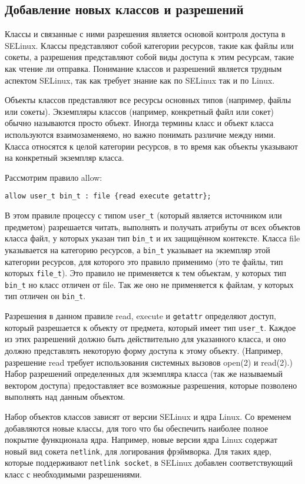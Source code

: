 \documentclass{./../class/UIR}
\begin{document}
\subsection{Добавление новых классов и разрешений}
    Классы и связанные с ними разрешения является основой контроля доступа в
    SELinux. Классы представляют собой категории ресурсов, такие как файлы или
    сокеты, а разрешения представляют собой виды доступа к этим ресурсам, такие
    как чтение ли отправка. Понимание классов и разрешений является трудным
    аспектом SELinux, так как требует знание как по SELinux так и по Linux.

	Объекты классов представляют все ресурсы основных типов (например, файлы или
	сокеты). Экземпляры классов (например, конкретный файл или сокет) обычно
	называются просто объект. Иногда термины класс и объект класса используются
	взаимозаменяемо, но важно понимать различие между ними. Класса относятся к
	целой категории ресурсов, в то время как объекты указывают на конкретный
	экземпляр класса.
	
	Рассмотрим правило allow:
	\begin{verbatim}
allow user_t bin_t : file {read execute getattr};
	\end{verbatim}
	В этом правиле процессу с типом \verb"user_t" (который является источником или
	предметом) разрешается читать, выполнять и получать атрибуты от всех объектов
	класса файл, у которых указан тип \verb"bin_t" и их защищённом контексте.
	Класса file указывается на категорию ресурсов, а \verb"bin_t" указывает на экземпляр этой
	категории ресурсов, для которого это правило применимо (это те файлы, тип
	которых \verb"file_t"). Это правило не применяется к тем объектам, у которых
	тип \verb"bin_t" но класс отличен от file. Так же оно не применяется к файлам, у
	которых тип отличен он \verb"bin_t".
	
	Разрешения в данном правиле read, execute и \verb"getattr" определяют доступ,
	который разрешается к объекту от предмета, который имеет тип \verb"user_t".
	Каждое из этих разрешений должно быть действительно для указанного класса, и оно должно
	представлять некоторую форму доступа к этому объекту. (Например, разрешение
	read требует использования системных вызовов open(2) и read(2).) Набор
	разрешений определенных для экземпляра класса (так же называемый вектором
	доступа) предоставляет все возможные разрешения, которые позволено выполнять
	над данным объектом.
	
	Набор объектов классов зависят от версии SELinux и ядра Linux. Со временем
	добавляются новые классы, для того что бы обеспечить наиболее полное покрытие
	функционала ядра. Например, новые версии ядра Linux содержат новый вид сокета
	\verb"netlink", для логирования фрэймворка. Для таких ядер, которые
	поддерживают \verb"netlink socket", в SELinux добавлен соответствующий класс с
	необходимыми разрешениями.
	
\end{document}
